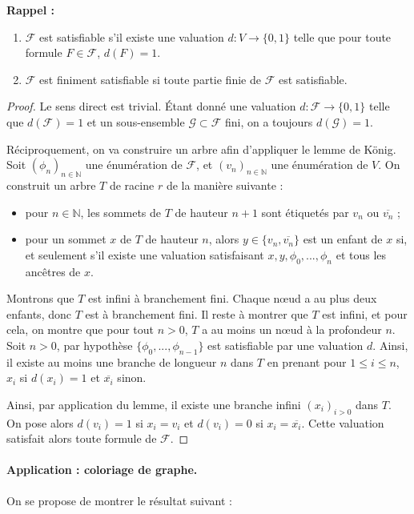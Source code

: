 \noindent \textbf{Rappel :}
\begin{enumerate}
\item $\mathcal{F}$ est satisfiable s'il existe une valuation $d : V \rightarrow \{0,1\}$ telle que pour toute formule $F\in \mathcal{F}$, $d(F)=1$.
\item $\mathcal{F}$ est finiment satisfiable si toute partie finie de $\mathcal{F}$ est satisfiable.
\end{enumerate}

\begin{proof}
Le sens direct est trivial. Étant donné une valuation $d : \mathcal{F} \rightarrow \{0,1\}$ telle que $d(\mathcal{F})=1$ et un sous-ensemble $\mathcal{G} \subset \mathcal{F}$ fini, on a toujours $d(\mathcal{G})=1$.

Réciproquement, on va construire un arbre afin d'appliquer le lemme de König. Soit $(\phi_n)_{n\in \mathbb{N}}$ une énumération de $\mathcal{F}$, et $(v_n)_{n \in \mathbb{N}}$ une énumération de $V$. On construit un arbre $T$ de racine $r$ de la manière suivante :
\begin{itemize}
\item pour $n\in \mathbb{N}$, les sommets de $T$ de hauteur $n+1$ sont étiquetés par $v_n$ ou $\overline{v_n}$ ;
\item pour un sommet $x$ de $T$ de hauteur $n$, alors $y \in \{v_n,\overline{v_n}\}$ est un enfant de $x$ si, et seulement s'il existe une valuation satisfaisant $x,y,\phi_0,...,\phi_n$ et tous les ancêtres de $x$. 
\end{itemize}


Montrons que $T$ est infini à branchement fini. Chaque nœud a au plus deux enfants, donc $T$ est à branchement fini. Il reste à montrer que $T$ est infini, et pour cela, on montre que pour tout $n> 0$, $T$ a au moins un nœud à la profondeur $n$. 
Soit $n>0$, par hypothèse $\{\phi_0,...,\phi_{n-1} \}$ est satisfiable par une valuation $d$. Ainsi, il existe au moins une branche de longueur $n$ dans $T$ en prenant pour $1\leq i \leq n$, $x_i$ si $d(x_i)=1$ et $\overline{x_i}$ sinon.

Ainsi, par application du lemme, il existe une branche infini $(x_i)_{i>0}$ dans $T$. On pose alors $d(v_i) =1$ si $x_i = v_i$ et $d(v_i)=0$ si $x_i = \overline{x_i}$. Cette valuation satisfait alors toute formule de $\mathcal{F}$.
\end{proof}


\paragraph{Application : coloriage de graphe.} On se propose de montrer le résultat suivant :

